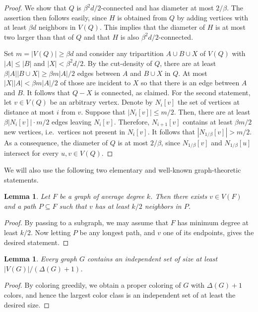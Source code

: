 \documentclass[10pt]{article}
\newtheorem{lemma}[theorem]{Lemma}
\theoremstyle{definition}
\let\leq\leqslant
\let\geq\geqslant
\begin{document}
\begin{proof}
We show that $Q$ is $\beta^2 d/2$-connected and has diameter at most $2/\beta$. The assertion then follows easily, since $H$ is obtained from $Q$ by adding vertices with at least $\beta d$ neighbors in $V(Q)$. This implies that the diameter of $H$ is at most two larger than that of $Q$ and that $H$ is also $\beta^2 d/2$-connected.

Set $m=|V(Q)|\geq \beta d$ and consider any tripartition $A\cup B\cup X$ of $ V(Q)$ with $|A|\leq |B|$ and $|X|<\beta^2 d/2$. By the cut-density of $Q$, there are at least $\beta|A||B\cup X|\geq \beta m|A|/2$ edges between $A$ and $B\cup X$ in $Q$. At most $|X||A|<\beta m|A|/2$ of those are incident to $X$ so that there is an edge between $A$ and $B$. It follows that $Q-X$ is connected, as claimed. For the second statement, let $v\in V(Q)$ be an arbitrary vertex. Denote by $N_i[v]$ the set of vertices at distance at most $i$ from $v$. Suppose that $|N_i[v]|\leq m/2$. Then, there are at least $\beta|N_i[v]|\cdot m/2$ edges leaving $N_i[v]$. Therefore, $N_{i+1}[v]$ contains at least $\beta m/2$ new vertices, i.e.\ vertices not present in $N_i[v]$. It follows that $|N_{1/\beta}[v]|> m/2$. As a consequence, the diameter of $Q$ is at most $2/\beta$, since $N_{1/\beta}[v]$ and $N_{1/\beta}[u]$ intersect for every $u,v\in V(Q)$.
\end{proof}
    We will also use the following two elementary and well-known graph-theoretic statements.
    \begin{lemma}\label{lem: get path from average degree}
    Let $F$ be a graph of average degree $k$. Then there exists $v\in V(F)$ and a path $P\subseteq F$ such that $v$ has at least $k/2$ neighbors in $P$.
\end{lemma}
\begin{proof}
    By passing to a subgraph, we may assume that $F$ has minimum degree at least $k/2$. Now letting $P$ be any longest path, and $v$ one of its endpoints, gives the desired statement.
\end{proof}
\begin{lemma}\label{lem: independent set}
    Every graph $G$ contains an independent set of size at least $|V(G)|/(\Delta(G)+1)$.
\end{lemma}
\begin{proof}
    By coloring greedily, we obtain a proper coloring of $G$ with $\Delta(G)+1$ colors, and hence the largest color class is an independent set of at least the desired size.
\end{proof}
\end{document}
